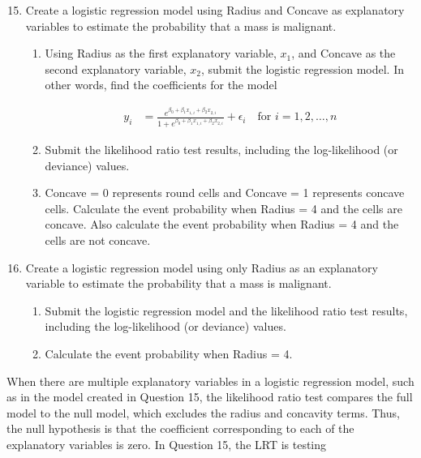 \documentclass[
]{report}
\begin{document}
\begin{enumerate}
  \setcounter{enumi}{14}

\item Create a logistic regression model using Radius and Concave as explanatory variables to estimate the probability that a mass is malignant.

\begin{enumerate}
  \item Using Radius as the first explanatory variable, $\scriptstyle x_1$, and Concave as the second explanatory variable, $\scriptstyle x_2$, submit the logistic regression model. In other words, find the coefficients for the model

\begin{align}
   y_i &= \frac{e^{\beta_0 + \beta_1 x_{1,i} + \beta_2 x_{2,i}}}{1 + e^{\beta_0 + \beta_1 x_{1,i} + \beta_2 x_{2,i}}} + \epsilon_i \quad \text{for } i = 1,2,\dots,n
\end{align}

   \item Submit the likelihood ratio test results, including the log-likelihood (or deviance) values.  
   \item Concave = 0 represents round cells and Concave = 1 represents concave cells. Calculate the event probability when Radius = 4 and the cells are concave. Also calculate the event probability when Radius = 4 and the cells are not concave.
\end{enumerate}


\item Create a logistic regression model using only Radius as an explanatory variable to estimate the probability that a mass is malignant.  
\begin{enumerate}
  \item Submit the logistic regression model and the likelihood ratio test results, including the log-likelihood (or deviance) values.  
  \item Calculate the event probability when Radius = 4.
\end{enumerate}
\end{enumerate}

When there are multiple explanatory variables in a logistic regression model, such as in the model created in Question 15, the likelihood ratio test compares the full model to the null model, which excludes the radius and concavity terms. Thus, the null hypothesis is that the coefficient corresponding to each of the explanatory variables is zero. In Question 15, the LRT is testing
\end{document}
